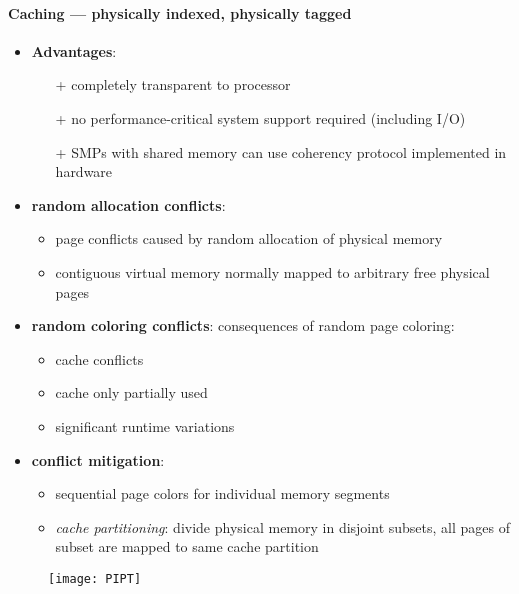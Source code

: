 \paragraph{Caching --- physically indexed, physically tagged}
\begin{itemize}
  \item \textbf{Advantages}:
  \begin{itemize}
    \item[+] completely transparent to processor
    \item[+] no performance-critical system support required (including I/O)
    \item[+] SMPs with shared memory can use coherency protocol implemented in hardware
  \end{itemize}
  \item \textbf{random allocation conflicts}:
  \begin{itemize}
    \item page conflicts caused by random allocation of physical memory
    \item contiguous virtual memory normally mapped to arbitrary free physical pages
  \end{itemize}
  \item \textbf{random coloring conflicts}: consequences of random page coloring:
  \begin{itemize}
    \item cache conflicts
    \item cache only partially used
    \item significant runtime variations
  \end{itemize}
  \item \textbf{conflict mitigation}:
  \begin{itemize}
    \item sequential page colors for individual memory segments
    \item \emph{cache partitioning}: divide physical memory in disjoint subsets, all pages of subset are mapped to same cache partition
  \end{itemize}
\end{itemize}
\begin{figure}[h]\centering\label{PIPT}\texttt{[image: PIPT]}\end{figure}
